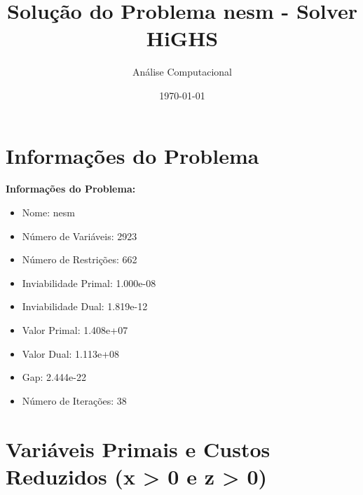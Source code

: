 \documentclass[12pt]{article}
\title{Solução do Problema nesm - Solver HiGHS}
\author{Análise Computacional}
\date{\today}
\begin{document}
\maketitle

\section{Informações do Problema}

\textbf{Informações do Problema:}
\begin{itemize}
\item Nome: nesm
\item Número de Variáveis: 2923
\item Número de Restrições: 662
\item Inviabilidade Primal: 1.000e-08
\item Inviabilidade Dual: 1.819e-12
\item Valor Primal: 1.408e+07
\item Valor Dual: 1.113e+08
\item Gap: 2.444e-22
\item Número de Iterações: 38
\end{itemize}


\section{Variáveis Primais e Custos Reduzidos (x > 0 e z > 0)}
\end{document}
